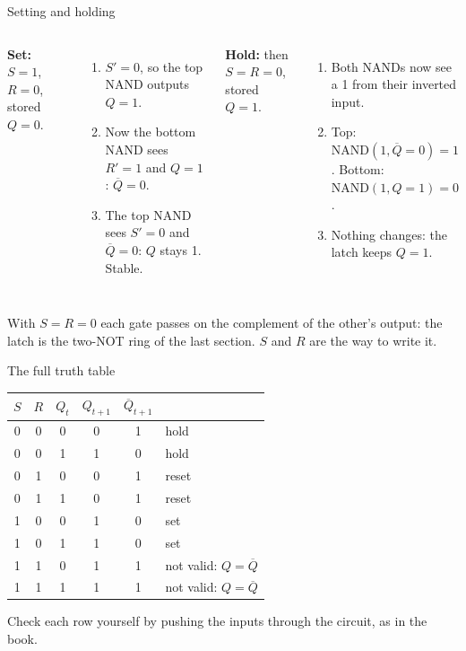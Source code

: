 \documentclass[10pt]{wosm-slides}
\begin{document}
\begin{frame}{Setting and holding}
  \begin{columns}[T, totalwidth=\textwidth]
      \textbf{Set:} $S = 1$, $R = 0$, stored $Q = 0$.
      \begin{enumerate}
        \item $S' = 0$, so the top NAND outputs $Q = 1$.
        \item Now the bottom NAND sees $R' = 1$ and $Q = 1$: $\overline{Q} = 0$.
        \item The top NAND sees $S' = 0$ and $\overline{Q} = 0$: $Q$ stays 1. Stable.
      \end{enumerate}
      \textbf{Hold:} then $S = R = 0$, stored $Q = 1$.
      \begin{enumerate}
        \item Both NANDs now see a 1 from their inverted input.
        \item Top: $\mathrm{NAND}(1, \overline{Q} = 0) = 1$. Bottom:
          $\mathrm{NAND}(1, Q = 1) = 0$.
        \item Nothing changes: the latch keeps $Q = 1$.
      \end{enumerate}
  \end{columns}

  \bigskip
  \begin{remark}
    With $S = R = 0$ each gate passes on the complement of the other's output: the
    latch is the two-NOT ring of the last section. $S$ and $R$ are the way to write it.
  \end{remark}
\end{frame}

\begin{frame}{The full truth table}
  \begin{center}
    \small
    \begin{tabular}{@{}ccc|cc|l@{}}
      $S$ & $R$ & $Q_t$ & $Q_{t+1}$ & $\overline{Q}_{t+1}$ & \\
      \midrule
      0 & 0 & 0 & 0 & 1 & hold \\
      0 & 0 & 1 & 1 & 0 & hold \\
      0 & 1 & 0 & 0 & 1 & reset \\
      0 & 1 & 1 & 0 & 1 & reset \\
      1 & 0 & 0 & 1 & 0 & set \\
      1 & 0 & 1 & 1 & 0 & set \\
      1 & 1 & 0 & \alert{1} & \alert{1} & not valid: $Q = \overline{Q}$ \\
      1 & 1 & 1 & \alert{1} & \alert{1} & not valid: $Q = \overline{Q}$ \\
    \end{tabular}
  \end{center}

  \medskip
  Check each row yourself by pushing the inputs through the circuit, as in the book.
\end{frame}
\end{document}
